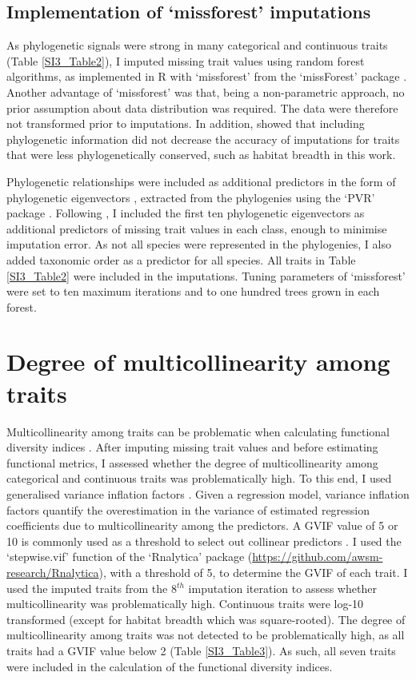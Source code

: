 \subsection{Implementation of `missforest' imputations}
As phylogenetic signals were strong in many categorical and continuous traits (Table \ref{SI3_Table2}), I imputed missing trait values using random forest algorithms, as implemented in R with `missforest' from the `missForest' package \citep{Stekhoven2012, Stekhoven2016}. Another advantage of `missforest' was that, being a non-parametric approach, no prior assumption about data distribution was required. The data were therefore not transformed prior to imputations. In addition, \citet{Penone2014} showed that including phylogenetic information did not decrease the accuracy of imputations for traits that were less phylogenetically conserved, such as habitat breadth in this work. 

Phylogenetic relationships were included as additional predictors in the form of phylogenetic eigenvectors \citep{DinizFilho2012}, extracted from the phylogenies using the `PVR' package \citep{Santos2018}. Following \citet{Penone2014}, I included the first ten phylogenetic eigenvectors as additional predictors of missing trait values in each class, enough to minimise imputation error. As not all species were represented in the phylogenies, I also added taxonomic order as a predictor for all species. All traits in Table \ref{SI3_Table2} were included in the imputations. Tuning parameters of `missforest' were set to ten maximum iterations and to one hundred trees grown in each forest. 

\section{Degree of multicollinearity among traits}
Multicollinearity among traits can be problematic when calculating functional diversity indices \citep{Cadotte2011}. After imputing missing trait values and before estimating functional metrics, I assessed whether the degree of multicollinearity among categorical and continuous traits was problematically high. To this end, I used generalised variance inflation factors \citep{Fox1992}. Given a regression model, variance inflation factors quantify the overestimation in the variance of estimated regression coefficients due to multicollinearity among the predictors. A GVIF value of 5 or 10 is commonly used as a threshold to select out collinear predictors \citep{Dormann2013}. I used the `stepwise.vif' function of the `Rnalytica' package (\url{https://github.com/awsm-research/Rnalytica}), with a threshold of 5, to determine the GVIF of each trait. I used the imputed traits from the 8$^{th}$ imputation iteration to assess whether multicollinearity was problematically high. Continuous traits were log-10 transformed (except for habitat breadth which was square-rooted). The degree of multicollinearity among traits was not detected to be problematically high, as all traits had a GVIF value below 2 (Table \ref{SI3_Table3}). As such, all seven traits were included in the calculation of the functional diversity indices.

